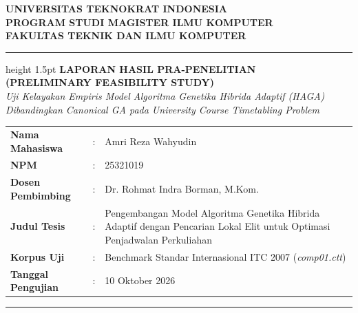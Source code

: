 \documentclass[a4paper,11pt]{article}
\begin{document}
\begin{center}
    {\large\bfseries UNIVERSITAS TEKNOKRAT INDONESIA}\\[0.1em]
    {\normalsize\bfseries PROGRAM STUDI MAGISTER ILMU KOMPUTER}\\[0.1em]
    {\normalsize\bfseries FAKULTAS TEKNIK DAN ILMU KOMPUTER}\\[0.5em]
    \hrule height 1.5pt
    \vspace{0.4cm}
    {\Large\bfseries LAPORAN HASIL PRA-PENELITIAN}\\[0.2em]
    {\large\bfseries (PRELIMINARY FEASIBILITY STUDY)}\\[0.3em]
    {\normalsize\itshape Uji Kelayakan Empiris Model Algoritma Genetika Hibrida Adaptif (HAGA) Dibandingkan Canonical GA pada University Course Timetabling Problem}
\end{center}

\vspace{0.3cm}
\noindent\begin{tabularx}{\textwidth}{@{}llX@{}}
    \textbf{Nama Mahasiswa} &:& Amri Reza Wahyudin \\
    \textbf{NPM} &:& 25321019 \\
    \textbf{Dosen Pembimbing} &:& Dr. Rohmat Indra Borman, M.Kom. \\
    \textbf{Judul Tesis} &:& Pengembangan Model Algoritma Genetika Hibrida Adaptif dengan Pencarian Lokal Elit untuk Optimasi Penjadwalan Perkuliahan \\
    \textbf{Korpus Uji} &:& Benchmark Standar Internasional ITC 2007 (\textit{comp01.ctt}) \\
    \textbf{Tanggal Pengujian} &:& 10 Oktober 2026 \\
\end{tabularx}

\vspace{0.3cm}
\hrule
\vspace{0.4cm}

\end{document}
